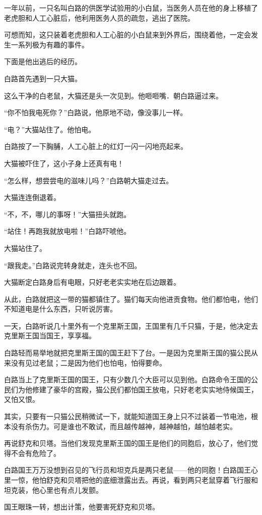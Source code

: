\documentclass[a4paper,12pt,UTF8,twoside]{ctexbook}
\begin{document}
一年以前，一只名叫白路的供医学试验用的小白鼠，当医务人员在他的身上移植了老虎胆和人工心脏后，他利用医务人员的疏忽，逃出了医院。

可想而知，这只装着老虎胆和人工心脏的小白鼠来到外界后，围绕着他，一定会发生一系列极为有趣的事件。

下面是他出逃后的经历。

白路首先遇到一只大猫。

这么干净的白老鼠，大猫还是头一次见到。他咂咂嘴．朝白路逼过来。

“你不怕我电死你？”白路说，他原地不动，像没事儿一样。

“电？”大猫站住了。他怕电。

白路按了一下胸脯，人工心脏上的红灯一闪一闪地亮起来。

大猫被吓住了，这小子身上还真有电！

“怎么样，想尝尝电的滋味儿吗？”白路朝大猫走过去。

大猫连连倒退着。

“不，不，哪儿的事呀！”大猫扭头就跑。

“站住！再跑我就放电啦！”白路吓唬他。

大猫站住了。

“跟我走。”白路说完转身就走，连头也不回。

大猫断定白路身后有电眼，只好老老实实地在后边跟着。

从此，白路就把这一带的猫都镇住了。猫们每天向他进贡食物。他们都怕电，他们不知道电是什么东西，只听说厉害。

一天，白路听说几十里外有一个克里斯王国，王国里有几千只猫，于是，他决定去克里斯王国当国王，享享福。

白路轻而易举地就把克里斯王国的国王赶下了台。一是因为克里斯王国的猫公民从来没有见过老鼠；二是因为他们也怕电，怕得要命。

白路当上了克里斯王国的国王，只有少数几个大臣可以见到他。白路命令王国的公民们为他修建了豪华的宫殿，猫公民们都怕国王放电，只好老老实实地侍候国王，又怕又恨。

其实，只要有一只猫公民稍微试一下，就能知道国王身上只不过装着一节电池，根本没有杀伤力。可是谁也不敢试，而且越传越神，越神越怕，越怕越老实。

再说舒克和贝塔。当他们发现克里斯王国的国王是他们的同胞后，放心了，他们觉得不会有危险了。

白路国王万万没想到召见的飞行员和坦克兵是两只老鼠——他的同胞！白路国王心里一惊，他怕舒克和贝塔把他的底细泄露出去。再说，看到两只老鼠穿着飞行服和坦克装，他心里也有点儿发颤。

国王眼珠一转，想出计策，他要害死舒克和贝塔。
\end{document}
